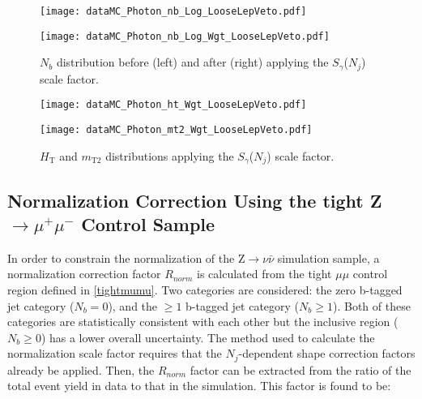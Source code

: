 \vspace {1em}

\begin{figure}[H]
\begin{center}
\begin{minipage}[b]{0.45\textwidth}
    \texttt{[image: dataMC\_Photon\_nb\_Log\_LooseLepVeto.pdf]}
\end{minipage}
\begin{minipage}[b]{0.45\textwidth}
    \texttt{[image: dataMC\_Photon\_nb\_Log\_Wgt\_LooseLepVeto.pdf]}
\end{minipage}
\end{center}
\vspace{-1em}
\caption{$N_b$ distribution before (left) and after (right) applying the $S_\gamma$($N_j$) scale factor. }
\end{figure}


\begin{figure}[tb]
\begin{center}
\begin{minipage}[b]{0.45\textwidth}
    \texttt{[image: dataMC\_Photon\_ht\_Wgt\_LooseLepVeto.pdf]}
\end{minipage}
\begin{minipage}[b]{0.45\textwidth}
    \texttt{[image: dataMC\_Photon\_mt2\_Wgt\_LooseLepVeto.pdf]}
\end{minipage}
\end{center}
\vspace{-1em}
\caption{$H_\text{T}$ and $m_\text{T2}$ distributions applying the $S_\gamma$($N_j$) scale factor. }
\end{figure}

\subsection{Normalization Correction Using the tight Z$\rightarrow\mu^{+}\mu^{-}$ Control Sample}\label{tightmumu}

In order to constrain the normalization of the Z$\rightarrow\nu\bar{\nu}$ simulation sample, a normalization correction factor $R_{norm}$ is calculated from the tight $\mu\mu$ control region defined in \autoref{tightmumu}. Two categories are considered: the zero b-tagged jet category ($N_b = 0$), and the $\geq 1$ b-tagged jet category ($N_b \geq 1$). Both of these categories are statistically consistent with each other but the inclusive region ($N_b \geq 0$) has a lower overall uncertainty. The method used to calculate the normalization scale factor requires that the $N_j$-dependent shape correction factors already be applied. Then, the $R_{norm}$ factor can be extracted from the ratio of the total event yield in data to that in the simulation. This factor is found to be:


